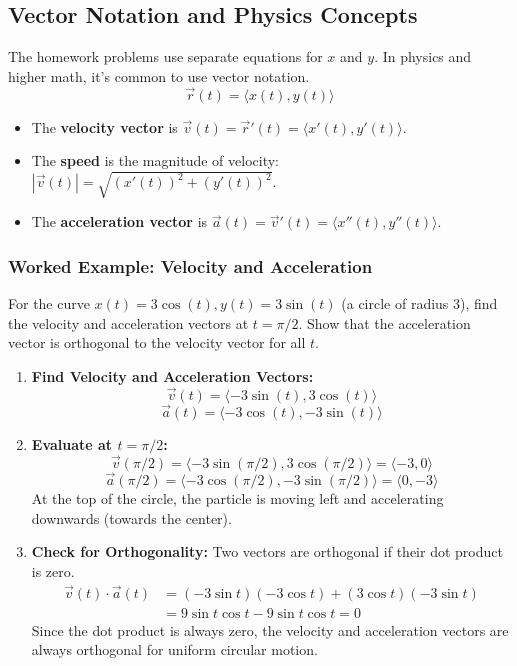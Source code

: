 \documentclass{article}
\begin{document}
\subsection{Vector Notation and Physics Concepts}
The homework problems use separate equations for $x$ and $y$. In physics and higher math, it's common to use vector notation.
\[ \vec{r}(t) = \langle x(t), y(t) \rangle \]
\begin{itemize}
    \item The \textbf{velocity vector} is $\vec{v}(t) = \vec{r}'(t) = \langle x'(t), y'(t) \rangle$.
    \item The \textbf{speed} is the magnitude of velocity: $|\vec{v}(t)| = \sqrt{(x'(t))^2 + (y'(t))^2}$.
    \item The \textbf{acceleration vector} is $\vec{a}(t) = \vec{v}'(t) = \langle x''(t), y''(t) \rangle$.
\end{itemize}

\subsubsection{Worked Example: Velocity and Acceleration}
For the curve $x(t) = 3\cos(t), y(t) = 3\sin(t)$ (a circle of radius 3), find the velocity and acceleration vectors at $t=\pi/2$. Show that the acceleration vector is orthogonal to the velocity vector for all $t$.
\begin{enumerate}
    \item \textbf{Find Velocity and Acceleration Vectors:}
    \[ \vec{v}(t) = \langle -3\sin(t), 3\cos(t) \rangle \]
    \[ \vec{a}(t) = \langle -3\cos(t), -3\sin(t) \rangle \]
    \item \textbf{Evaluate at $t=\pi/2$:}
    \[ \vec{v}(\pi/2) = \langle -3\sin(\pi/2), 3\cos(\pi/2) \rangle = \langle -3, 0 \rangle \]
    \[ \vec{a}(\pi/2) = \langle -3\cos(\pi/2), -3\sin(\pi/2) \rangle = \langle 0, -3 \rangle \]
    At the top of the circle, the particle is moving left and accelerating downwards (towards the center).
    \item \textbf{Check for Orthogonality:} Two vectors are orthogonal if their dot product is zero.
    \begin{align*}
    \vec{v}(t) \cdot \vec{a}(t) &= (-3\sin t)(-3\cos t) + (3\cos t)(-3\sin t) \\
    &= 9\sin t \cos t - 9\sin t \cos t = 0
    \end{align*}
    Since the dot product is always zero, the velocity and acceleration vectors are always orthogonal for uniform circular motion.
\end{enumerate}
\end{document}
